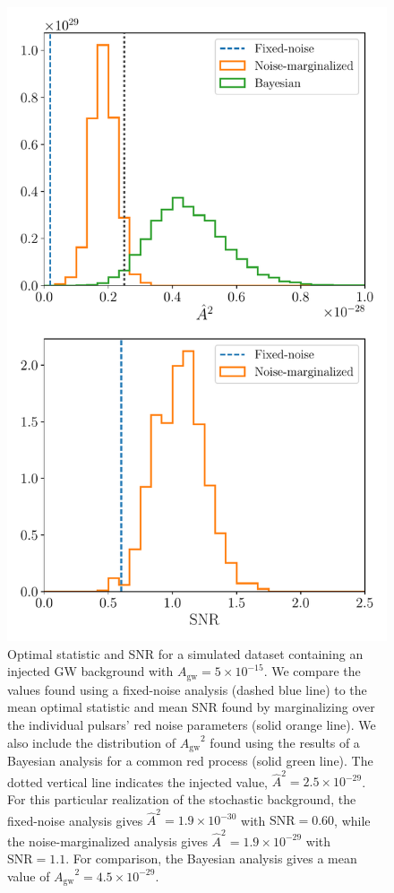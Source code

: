 \documentclass[twocolumn,aps,prd,superscriptaddress]{revtex4-1}
\newcommand{\Agw}{\ensuremath{A_\mathrm{gw}}}
\begin{document}
\begin{figure}[ht]
	\includegraphics[width=\columnwidth]{plots/os_dataset50.pdf}
	\caption{Optimal statistic and SNR for a simulated dataset 
			containing an injected GW background with $\Agw = 5\times10^{-15}$. 
			We compare the values found using a fixed-noise analysis (dashed blue line) to the 
			mean optimal statistic and mean SNR found by marginalizing over 
			the individual pulsars' red noise parameters (solid orange line). 
			We also include the distribution of $\Agw^2$ found using the results of a Bayesian analysis 
			for a common red process (solid green line). 
			The dotted vertical line indicates the injected value, $\hat{A}^2 = 2.5 \times 10^{-29}$. 
			For this particular realization of the stochastic background, the fixed-noise analysis 
			gives $\hat{A}^2 = 1.9 \times 10^{-30}$ with $\mathrm{SNR} = 0.60$, 
			while the noise-marginalized analysis gives $\hat{A}^2 = 1.9\times10^{-29}$ with $\mathrm{SNR} = 1.1$. 
			For comparison, the Bayesian analysis gives a mean value of $\Agw^2 = 4.5\times10^{-29}$.}
	\label{fig:os_dataset_sample}
\end{figure}
\end{document}
